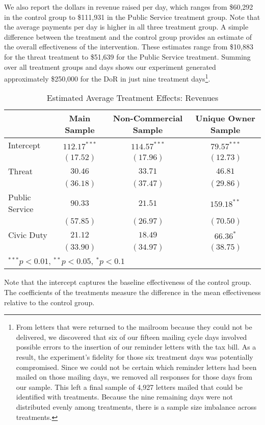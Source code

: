 \documentclass[12pt,titlepage]{article}
\begin{document}
We also report the dollars in revenue raised per day, which ranges
from \$60,292 in the control group to \$111,931 in the Public Service
treatment group. Note that the average payments per day is higher in
all three treatment group. A simple difference between the treatment
and the control group provides an estimate of the overall
effectiveness of the intervention. These estimates range from \$10,883
for the threat treatment to \$51,639 for the Public Service
treatment. Summing over all treatment groups and days shows 
our experiment generated approximately \$250,000 for the DoR in just
nine treatment days\footnote{From letters that were returned to the 
mailroom because they could not be delivered, we discovered that six 
of our fifteen mailing cycle days involved possible errors to the 
insertion of our reminder letters with the tax bill.  As a result, 
the experiment's fidelity for those six treatment days was 
potentially compromised.  Since we could not be certain which 
reminder letters had been mailed on those mailing days, we removed 
all responses for those days from our sample.  This left a final 
sample of 4,927 letters mailed that could be identified with 
treatments.  Because the nine remaining days were not distributed 
evenly among treatments, there is a sample size imbalance across treatments.}.  


\begin{table}
\caption{Estimated Average Treatment Effects: Revenues}
\begin{center}
\begin{tabular}{|l|c|c|c|}
\hline
               & Main Sample & Non-Commercial Sample & Unique Owner Sample \\
\hline
Intercept      & $112.17^{***}$ & $114.57^{***}$ & $79.57^{***}$ \\
               & $(17.52)$      & $(17.96)$      & $(12.73)$     \\
Threat         & $30.46$        & $33.71$        & $46.81$       \\
               & $(36.18)$      & $(37.47)$      & $(29.86)$     \\
Public Service & $90.33$        & $21.51$        & $159.18^{**}$ \\
               & $(57.85)$      & $(26.97)$      & $(70.50)$     \\
Civic Duty     & $21.12$        & $18.49$        & $66.36^{*}$   \\
               & $(33.90)$      & $(34.97)$      & $(38.75)$     \\
\hline
\multicolumn{4}{l}{\scriptsize{$^{***}p<0.01$, $^{**}p<0.05$, $^*p<0.1$}}
\end{tabular}
\label{dif_mean}
\end{center}
Note that the intercept captures the baseline effectiveness of the
control group. The coefficients of the treatments measure the
difference in the mean effectiveness relative to the control group.
\end{table}
\end{document}
